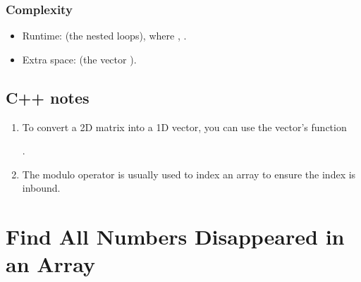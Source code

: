 \documentclass[letterpaper,12pt,english]{book}
\begin{document}
\subsubsection{Complexity}
\label{\detokenize{Array/01_ARR_1260_Shift_2D_Grid:complexity}}\begin{itemize}
\item {} 
\sphinxAtStartPar
Runtime:  (the nested  loops), where , .

\item {} 
\sphinxAtStartPar
Extra space:  (the vector ).

\end{itemize}


\subsection{C++ notes}
\label{\detokenize{Array/01_ARR_1260_Shift_2D_Grid:c-notes}}\begin{enumerate}
%
\item {} 
\sphinxAtStartPar
To convert a 2D matrix into a 1D vector, you can use the vector’s function %
\begin{footnote}[4]\sphinxAtStartFootnote
{}
%
\end{footnote}.

\item {} 
\sphinxAtStartPar
The modulo operator \sphinxcode{\sphinxupquote{\%}} is usually used to index an array to ensure the index is inbound.

\end{enumerate}

\sphinxstepscope


\section{Find All Numbers Disappeared in an Array}
\label{\detokenize{Array/01_ARR_448_Find_All_Numbers_Disappeared_in_an_Array:find-all-numbers-disappeared-in-an-array}}\label{\detokenize{Array/01_ARR_448_Find_All_Numbers_Disappeared_in_an_Array::doc}}
\end{document}
